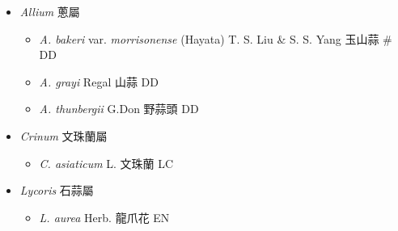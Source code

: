 
  \begin{itemize}
 \item[] \textit{Allium} 蔥屬
                                
  \begin{itemize}
        \item[] \textit{A. bakeri} var. \textit{morrisonense} (Hayata) T. S. Liu \& S. S. Yang  玉山蒜  \# DD
        \item[] \textit{A. grayi} Regal  山蒜   DD
        \item[] \textit{A. thunbergii} G.Don  野蒜頭   DD
  \end{itemize}
 \item[] \textit{Crinum} 文珠蘭屬
                                
  \begin{itemize}
        \item[] \textit{C. asiaticum} L.  文珠蘭   LC
  \end{itemize}
 \item[] \textit{Lycoris} 石蒜屬
                                
  \begin{itemize}
        \item[] \textit{L. aurea} Herb.  龍爪花   EN
  \end{itemize}
  \end{itemize}
